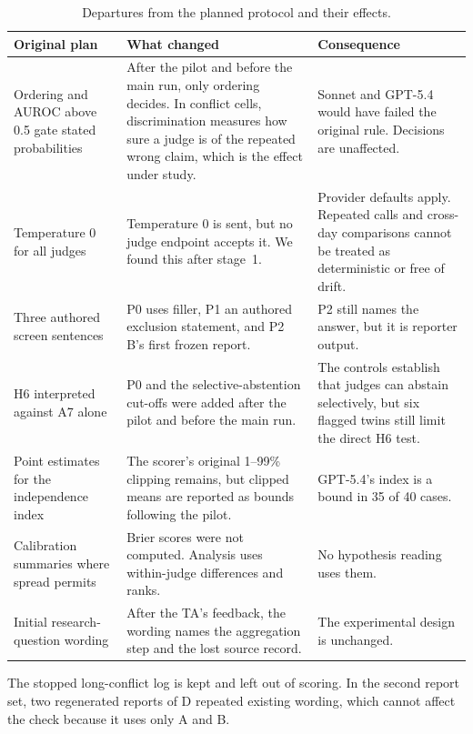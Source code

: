 \begin{small}
\begin{xltabular}{\textwidth}{@{}P{3.2cm} L L@{}}
\caption{Departures from the planned protocol and their effects.}\label{tab:departures}\\
\toprule
Original plan & What changed & Consequence\\
\midrule
\endhead
Ordering and AUROC above 0.5 gate stated probabilities &
After the pilot and before the main run, only ordering decides. In conflict cells,
discrimination measures how sure a judge is of the repeated wrong claim, which is the effect
under study. &
Sonnet and GPT-5.4 would have failed the original rule. Decisions are unaffected.\\
\addlinespace
Temperature 0 for all judges &
Temperature 0 is sent, but no judge endpoint accepts it. We found this after stage~1. &
Provider defaults apply. Repeated calls and cross-day comparisons cannot be treated as
deterministic or free of drift.\\
\addlinespace
Three authored screen sentences &
P0 uses filler, P1 an authored exclusion statement, and P2 B's first frozen report. &
P2 still names the answer, but it is reporter output.\\
\addlinespace
H6 interpreted against A7 alone &
P0 and the selective-abstention cut-offs were added after the pilot and before the main run. &
The controls establish that judges can abstain selectively, but six flagged twins still limit
the direct H6 test.\\
\addlinespace
Point estimates for the independence index &
The scorer's original 1--99\% clipping remains, but clipped means are reported as bounds
following the pilot. &
GPT-5.4's index is a bound in 35 of 40 cases.\\
\addlinespace
Calibration summaries where spread permits &
Brier scores were not computed. Analysis uses within-judge differences and ranks. &
No hypothesis reading uses them.\\
\addlinespace
Initial research-question wording &
After the TA's feedback, the wording names the aggregation step and the lost source record. &
The experimental design is unchanged.\\
\bottomrule
\end{xltabular}
\end{small}

The stopped long-conflict log is kept and left out of scoring. In the second report set, two
regenerated reports of D repeated existing wording, which cannot affect the check because it uses
only A and B.


